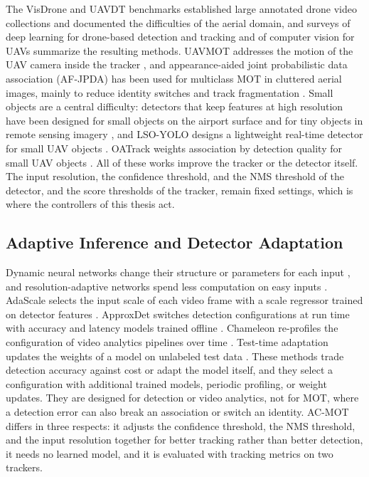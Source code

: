 The VisDrone \cite{zhu2022visdrone} and UAVDT \cite{du2018uavdt} benchmarks established large annotated drone video collections and documented the difficulties of the aerial domain, and surveys of deep learning for drone-based detection and tracking \cite{wu2022uavsurvey} and of computer vision for UAVs \cite{kanellakis2017uavvision} summarize the resulting methods. UAVMOT addresses the motion of the UAV camera inside the tracker \cite{liu2022uavmot}, and appearance-aided joint probabilistic data association (AF-JPDA) has been used for multiclass MOT in cluttered aerial images, mainly to reduce identity switches and track fragmentation \cite{kim2024afjpda}. Small objects are a central difficulty: detectors that keep features at high resolution have been designed for small objects on the airport surface \cite{huang2022airportsmall} and for tiny objects in remote sensing imagery \cite{fathy2026toren}, and LSO-YOLO designs a lightweight real-time detector for small UAV objects \cite{dai2026lsoyolo}. OATrack weights association by detection quality for small UAV objects \cite{qi2026oatrack}. All of these works improve the tracker or the detector itself. The input resolution, the confidence threshold, and the NMS threshold of the detector, and the score thresholds of the tracker, remain fixed settings, which is where the controllers of this thesis act.

\subsection{Adaptive Inference and Detector Adaptation}\label{sec:rw-inference}
Dynamic neural networks change their structure or parameters for each input \cite{han2022dynamic}, and resolution-adaptive networks spend less computation on easy inputs \cite{yang2020ranet}. AdaScale selects the input scale of each video frame with a scale regressor trained on detector features \cite{chin2019adascale}. ApproxDet switches detection configurations at run time with accuracy and latency models trained offline \cite{xu2020approxdet}. Chameleon re-profiles the configuration of video analytics pipelines over time \cite{jiang2018chameleon}. Test-time adaptation updates the weights of a model on unlabeled test data \cite{wang2021tent}. These methods trade detection accuracy against cost or adapt the model itself, and they select a configuration with additional trained models, periodic profiling, or weight updates. They are designed for detection or video analytics, not for MOT, where a detection error can also break an association or switch an identity. AC-MOT differs in three respects: it adjusts the confidence threshold, the NMS threshold, and the input resolution together for better tracking rather than better detection, it needs no learned model, and it is evaluated with tracking metrics on two trackers.

